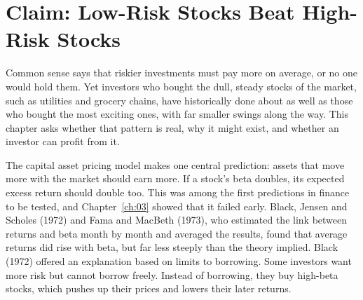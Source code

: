 \makeatletter
{}
\makeatother

\makeatletter
\makeatother

\chapter{Claim: Low-Risk Stocks Beat High-Risk Stocks}
\label{ch:14}
\providecommand{\term}[1]{\emph{#1}}

Common sense says that riskier investments must pay more on average, or no one would hold them. Yet investors who bought the dull, steady stocks of the market, such as utilities and grocery chains, have historically done about as well as those who bought the most exciting ones, with far smaller swings along the way. This chapter asks whether that pattern is real, why it might exist, and whether an investor can profit from it.

The capital asset pricing model makes one central prediction: assets that move more with the market should earn more. If a stock's beta doubles, its expected excess return should double too. This was among the first predictions in finance to be tested, and Chapter~\ref{ch:03} showed that it failed early. Black, Jensen and Scholes (1972) and Fama and MacBeth (1973), who estimated the link between returns and beta month by month and averaged the results, found that average returns did rise with beta, but far less steeply than the theory implied. Black (1972) offered an explanation based on limits to borrowing. Some investors want more risk but cannot borrow freely. Instead of borrowing, they buy high-beta stocks, which pushes up their prices and lowers their later returns.

